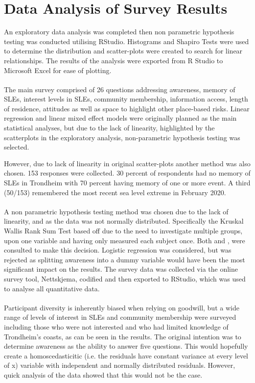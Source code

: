 \section{Data Analysis of Survey Results}
An exploratory data analysis was completed then non parametric hypothesis testing was conducted utilising RStudio. Histograms and Shapiro Tests were used to determine the distribution and scatter-plots were created to search for linear relationships. The results of the analysis were exported from R Studio to Microsoft Excel for ease of plotting.
\paragraph{}
The main survey comprised of 26 questions addressing awareness, memory of SLEs, interest levels in SLEs, community membership, information access, length of residence, attitudes as well as space to highlight other place-based risks. Linear regression and linear mixed effect models were originally planned as the main statistical analyses, but due to the lack of linearity, highlighted by the scatterplots in the exploratory analysis, non-parametric hypothesis testing was selected.


However, due to lack of linearity in original scatter-plots another method was also chosen. 153 responses were collected. 30 percent of respondents had no memory of SLEs in Trondheim with 70 percent having memory of one or more event. A third (50/153) remembered the most recent sea level extreme in February 2020. 
\paragraph{}
A non parametric hypothesis testing method was chosen due to the lack of linearity, and as the data was not normally distributed. Specifically the Kruskal Wallis Rank Sum Test based off \cite{hollander_nonparametric_2014} due to the need to investigate multiple groups, upon one variable and having only measured each subject once. Both \cite{tasman_how_2014} and \cite{hollander_nonparametric_2014}, were consulted to make this decision. Logistic regression was considered, but was rejected as splitting awareness into a dummy variable would have been the most significant impact on the results. The survey data was collected via the online survey tool, Nettskjema, codified and then exported to RStudio, which was used to analyse all quantitative data.
\paragraph{}
Participant diversity is inherently biased when relying on goodwill, but a wide range of levels of interest in SLEs and community membership were surveyed including those who were not interested and who had limited knowledge of Trondheim’s coasts, as can be seen in the results. The original intention was to determine awareness as the ability to answer five questions. This would hopefully create a homoscedasticitic (i.e. the residuals have constant variance at every level of x) variable with independent and normally distributed residuals. However, quick analysis of the data showed that this would not be the case.
